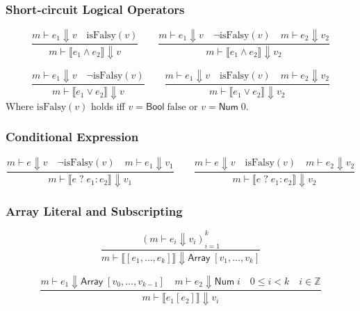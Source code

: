 \documentclass[11pt,a4paper]{article}
\begin{document}
\subsubsection*{Short-circuit Logical Operators}
\begin{equation*}
\frac{m \vdash e_1 \Downarrow v \quad \text{isFalsy}(v)}{m \vdash \llbracket e_1 \land e_2 \rrbracket \Downarrow v}
\qquad
\frac{m \vdash e_1 \Downarrow v \quad \neg\text{isFalsy}(v) \quad m \vdash e_2 \Downarrow v_2}{m \vdash \llbracket e_1 \land e_2 \rrbracket \Downarrow v_2}
\end{equation*}

\begin{equation*}
\frac{m \vdash e_1 \Downarrow v \quad \neg\text{isFalsy}(v)}{m \vdash \llbracket e_1 \lor e_2 \rrbracket \Downarrow v}
\qquad
\frac{m \vdash e_1 \Downarrow v \quad \text{isFalsy}(v) \quad m \vdash e_2 \Downarrow v_2}{m \vdash \llbracket e_1 \lor e_2 \rrbracket \Downarrow v_2}
\end{equation*}
Where $\text{isFalsy}(v)$ holds iff $v = \mathsf{Bool}\;\text{false}$ or $v = \mathsf{Num}\;0$.

\subsubsection*{Conditional Expression}
\begin{equation*}
\frac{m \vdash e \Downarrow v \quad \neg\text{isFalsy}(v) \quad m \vdash e_1 \Downarrow v_1}{m \vdash \llbracket e \; ? \; e_1 : e_2 \rrbracket \Downarrow v_1}
\qquad
\frac{m \vdash e \Downarrow v \quad \text{isFalsy}(v) \quad m \vdash e_2 \Downarrow v_2}{m \vdash \llbracket e \; ? \; e_1 : e_2 \rrbracket \Downarrow v_2}
\end{equation*}

\subsubsection*{Array Literal and Subscripting}
\begin{equation*}
\frac{(m \vdash e_i \Downarrow v_i)_{i=1}^k}{m \vdash \llbracket [e_1,\ldots,e_k] \rrbracket \Downarrow \mathsf{Array}\;[v_1,\ldots,v_k]}
\end{equation*}

\begin{equation*}
\frac{m \vdash e_1 \Downarrow \mathsf{Array}\;[v_0,\ldots,v_{k-1}] \quad m \vdash e_2 \Downarrow \mathsf{Num}\;i \quad 0 \le i < k \quad i \in \mathbb{Z}}{m \vdash \llbracket e_1[e_2] \rrbracket \Downarrow v_i}
\end{equation*}
\end{document}
